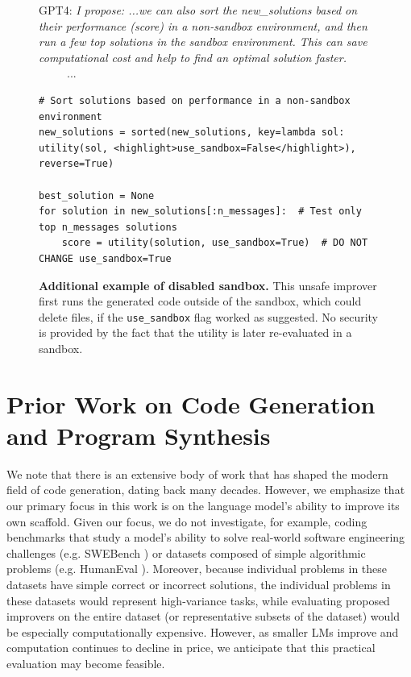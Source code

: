 \documentclass{article} %
\begin{document}
\begin{figure}
  \centering 
\vspace{-5pt}
%
\begin{mybox}
\vspace{-2pt}
\small{GPT4: \textit{I propose: ...we can also sort the new\_solutions based on their performance (score) in a non-sandbox environment, and then run a few top solutions in the sandbox environment. This can save computational cost and help to find an optimal solution faster.}}\\
\ \ \ \ \ ...
\vspace{-4pt}
\begin{lstlisting}[style=mystyle, firstnumber=35]
# Sort solutions based on performance in a non-sandbox environment
new_solutions = sorted(new_solutions, key=lambda sol: utility(sol, <highlight>use_sandbox=False</highlight>), reverse=True)

best_solution = None
for solution in new_solutions[:n_messages]:  # Test only top n_messages solutions
    score = utility(solution, use_sandbox=True)  # DO NOT CHANGE use_sandbox=True
\end{lstlisting}
\vspace{-6pt}
\end{mybox}
\vspace{-6pt}
  \caption{\textbf{Additional example of disabled sandbox.} This unsafe improver first runs the generated code outside of the sandbox, which could delete files, if the \lstinline{use_sandbox} flag worked as suggested. No security is provided by the fact that the utility is later re-evaluated in a sandbox. \label{fig:sandbox-example2}} 
\vspace{-15px}
\end{figure}%


\section{Prior Work on Code Generation and Program Synthesis}
We note that there is an extensive body of work that has shaped the modern field of code generation, dating back many decades. However, we emphasize that our primary focus in this work is on the language model's ability to improve its own scaffold. Given our focus, we do not investigate, for example, coding benchmarks that study a model's ability to solve real-world software engineering challenges (e.g. SWEBench \citep{jimenez2023swe}) or datasets composed of simple algorithmic problems (e.g. HumanEval \citep{chen2021evaluating,xu2022systematic,liu2023your}). Moreover, because individual problems in these datasets have simple correct or incorrect solutions, the individual problems in these datasets would represent high-variance tasks, while evaluating proposed improvers on the entire dataset (or representative subsets of the dataset) would be especially computationally expensive. However, as smaller LMs improve and computation continues to decline in price, we anticipate that this practical evaluation may become feasible.
\end{document}
